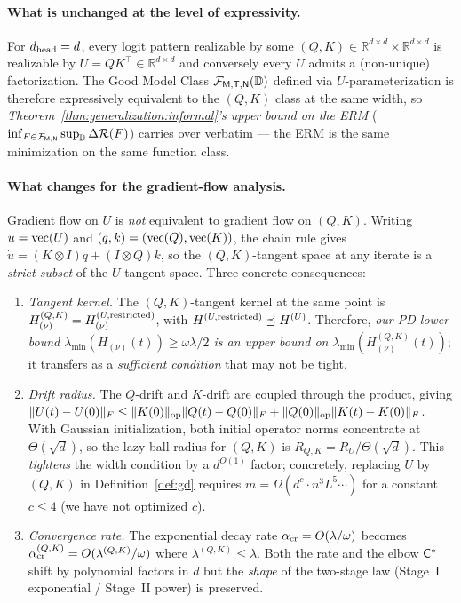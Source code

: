 \documentclass[11pt]{article}
\theoremstyle{plain}
\newcommand{\R}{\mathbb{R}}
\begin{document}
\paragraph{What is unchanged at the level of expressivity.}
For $d_{\rm head}=d$, every logit pattern realizable by some $(Q,K)\in\R^{d\times d}\times\R^{d\times d}$ is realizable by $U=QK^\top\in\R^{d\times d}$ and conversely every $U$ admits a (non-unique) factorization. The Good Model Class ${\cal F}_{\sf M,T,N}(\mathbb{D})$ defined via $U$-parameterization is therefore expressively equivalent to the $(Q,K)$ class at the same width, so {\it Theorem~\ref{thm:generalization:informal}'s upper bound on the ERM} ($\inf_{F\in{\cal F}_{\sf M,N}}\sup_{\mathbb{D}}\Delta{\cal R}(F)$) carries over verbatim --- the ERM is the same minimization on the same function class.

\paragraph{What changes for the gradient-flow analysis.}
Gradient flow on $U$ is {\it not} equivalent to gradient flow on $(Q,K)$. Writing $u={\rm vec}(U)$ and $(q,k)=({\rm vec}(Q),{\rm vec}(K))$, the chain rule gives $\dot u = (K\otimes I)\dot q + (I\otimes Q)\dot k$, so the $(Q,K)$-tangent space at any iterate is a {\it strict subset} of the $U$-tangent space. Three concrete consequences:
\begin{enumerate}
    \item[(i)] {\it Tangent kernel.} The $(Q,K)$-tangent kernel at the same point is $H^{(Q,K)}_{(\nu)} = H^{(U,\rm restricted)}_{(\nu)}$, with $H^{(U,\rm restricted)} \preceq H^{(U)}$. Therefore, {\it our PD lower bound $\lambda_{\min}(H_{(\nu)}(t))\ge \omega\lambda/2$ is an upper bound on $\lambda_{\min}(H^{(Q,K)}_{(\nu)}(t))$}; it transfers as a {\it sufficient condition} that may not be tight.
    \item[(ii)] {\it Drift radius.} The $Q$-drift and $K$-drift are coupled through the product, giving $\|U(t)-U(0)\|_F \le \|K(0)\|_{\rm op}\|Q(t)-Q(0)\|_F + \|Q(0)\|_{\rm op}\|K(t)-K(0)\|_F$. With Gaussian initialization, both initial operator norms concentrate at $\Theta(\sqrt d)$, so the lazy-ball radius for $(Q,K)$ is $R_{Q,K} = R_U/\Theta(\sqrt d)$. This {\it tightens} the width condition by a $d^{O(1)}$ factor; concretely, replacing $U$ by $(Q,K)$ in Definition~\ref{def:gd} requires $m=\Omega(d^c\cdot n^3 L^5\cdots)$ for a constant $c\le 4$ (we have not optimized $c$).
    \item[(iii)] {\it Convergence rate.} The exponential decay rate $\alpha_{\rm cr}=O(\lambda/\omega)$ becomes $\alpha_{\rm cr}^{(Q,K)} = O(\lambda^{(Q,K)}/\omega)$ where $\lambda^{(Q,K)}\le \lambda$. Both the rate and the elbow ${\sf C}^*$ shift by polynomial factors in $d$ but the {\it shape} of the two-stage law (Stage~I exponential / Stage~II power) is preserved.
\end{enumerate}
\end{document}

